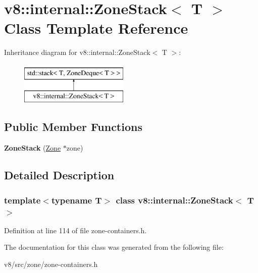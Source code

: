 \hypertarget{classv8_1_1internal_1_1ZoneStack}{}\section{v8\+:\+:internal\+:\+:Zone\+Stack$<$ T $>$ Class Template Reference}
\label{classv8_1_1internal_1_1ZoneStack}
Inheritance diagram for v8\+:\+:internal\+:\+:Zone\+Stack$<$ T $>$\+:\begin{figure}[H]
\begin{center}
\leavevmode
\includegraphics[height=2.000000cm]{classv8_1_1internal_1_1ZoneStack}
\end{center}
\end{figure}
\subsection*{Public Member Functions}
\begin{DoxyCompactItemize}
\item 
\mbox{\label{classv8_1_1internal_1_1ZoneStack_a45ee8f83517d8580883b668601ddad82}} 
{\bfseries Zone\+Stack} (\mbox{\hyperlink{classv8_1_1internal_1_1Zone}{Zone}} $\ast$zone)
\end{DoxyCompactItemize}


\subsection{Detailed Description}
\subsubsection*{template$<$typename T$>$\newline
class v8\+::internal\+::\+Zone\+Stack$<$ T $>$}



Definition at line 114 of file zone-\/containers.\+h.



The documentation for this class was generated from the following file\+:\begin{DoxyCompactItemize}
\item 
v8/src/zone/zone-\/containers.\+h\end{DoxyCompactItemize}
